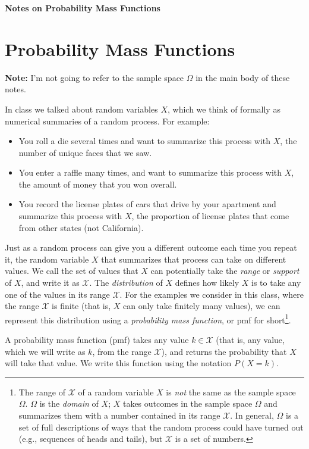\documentclass[11pt]{article}
\begin{document}
\centerline{\textbf{Notes on Probability Mass Functions}}
\section*{Probability Mass Functions}
{\bf Note:} I'm not going to refer to the sample space $\Omega$ in the main body of these notes.

In class we talked about random variables $X$, which we think of formally as numerical summaries of a random process.
For example:
\begin{itemize}
\item You roll a die several times and want to summarize this process with $X$, the number of unique faces that we saw.
\item You enter a raffle many times, and want to summarize this process with $X$, the amount of money that you won overall.
\item You record the license plates of cars that drive by your apartment and summarize this process with $X$, the proportion of license plates that come from other states (not California).
\end{itemize}

Just as a random process can give you a different outcome each time you repeat it, the random variable $X$ that summarizes that process can take on different values.
We call the set of values that $X$ can potentially take the \emph{range} or \emph{support} of $X$, and write it as $\mathcal X$. The \emph{distribution} of $X$ defines
how likely $X$ is to take any one of the values in its range $\mathcal X$. For the examples we consider in this class, where the range $\mathcal X$ is finite (that is, $X$ can only take
finitely many values), we can represent this distribution using a \emph{probability mass function}, or pmf for short\footnote{The range of $\mathcal X$ of a random variable $X$ is \emph{not} the same as the sample space $\Omega$. $\Omega$ is the \emph{domain} of $X$; $X$ takes outcomes in the sample space $\Omega$ and summarizes them with a number contained in its range $\mathcal X$. In general, $\Omega$ is a set of full descriptions of ways that the random process could have turned out (e.g., sequences of heads and tails), but $\mathcal X$ is a set of numbers.}.

A probability mass function (pmf) takes any value $k \in \mathcal X$ (that is, any value, which we will write as $k$, from the range $\mathcal X$), and returns the probability that $X$ will take that value. We write this function using the notation $P(X = k)$.
\end{document}
